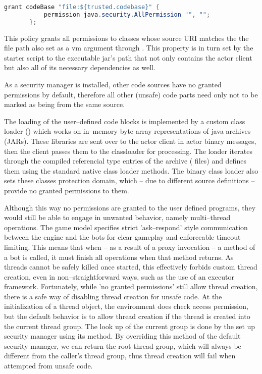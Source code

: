 			\begin{center}
				\begin{minipage}{11cm}
					\begin{lstlisting}[language=Java, title={\code{client.policy}}]
	   grant codeBase "file:${trusted.codebase}" {
		   permission java.security.AllPermission "", "";
	   };
					\end{lstlisting}
				\end{minipage}
			\end{center}
		
			This policy grants all permissions to classes whose source URI matches the the file path also set as a vm argument through . This property is in turn set by the starter script to the executable jar's path that not only contains the actor client but also all of its necessary dependencies as well.
			
			As a security manager is installed, other code sources have no granted permissions by default, therefore all other (unsafe) code parts need only not to be marked as being from the same source.
			
			The loading of the user--defined code blocks is implemented by a custom class loader () which works on in--memory byte array representations of java archives (JARs). These libraries are sent over to the actor client in actor binary messages, then the client passes them to the classloader for processing. The loader iterates through the compiled referencial type entries of the archive ( files) and defines them using the standard native class loader methods. The binary class loader also sets these classes protection domain, which -- due to different source definitions -- provide no granted permissions to them.
			
			Although this way no permissions are granted to the user defined programs, they would still be able to engage in unwanted behavior, namely multi--thread operations. The game model specifies strict 'ask--respond' style communication between the engine and the bots for clear gameplay and enforceable timeout limiting. This means that when -- as a result of a proxy invocation -- a method of a bot is called, it must finish all operations when that method returns. As threads cannot be safely killed once started, this effectively forbids custom thread creation, even in non--straightforward ways, such as the use of an executor framework. Fortunately, while 'no granted permissions' still allow thread creation, there is a safe way of disabling thread creation for unsafe code. At the initialization of a thread object, the environment does check access permission, but the default behavior is to allow thread creation if the thread is created into the current thread group. The look up of the current group is done by the set up security manager using its  method. By overriding this method of the default security manager, we can return the root thread group, which will always be different from the caller's thread group, thus thread creation will fail when attempted from unsafe code.
			
